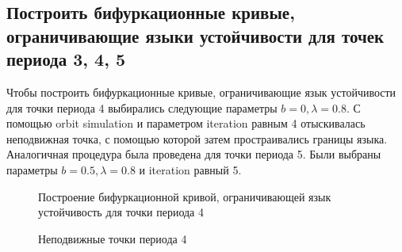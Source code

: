 \documentclass[12pt, a4paper]{article}
\begin{document}
\subsection{Построить бифуркационные кривые, ограничивающие языки устойчивости для точек периода 3, 4, 5}
Чтобы построить бифуркационные кривые, ограничивающие язык устойчивости для точки периода 4 выбирались следующие параметры $b = 0, \lambda = 0.8$. С помощью orbit simulation и параметром iteration равным 4 отыскивалась неподвижная точка, с помощью которой затем простраивались границы языка. Аналогичная процедура была проведена для точки периода 5. Были выбраны параметры $b = 0.5, \lambda = 0.8$ и iteration равный 5.

\begin{figure}[H]
	\caption{Построение бифуркационной кривой, ограничивающей язык устойчивость для точки периода 4}
\end{figure}

\begin{figure}[H]
	\caption{Неподвижные точки периода 4}
\end{figure}
\end{document}
